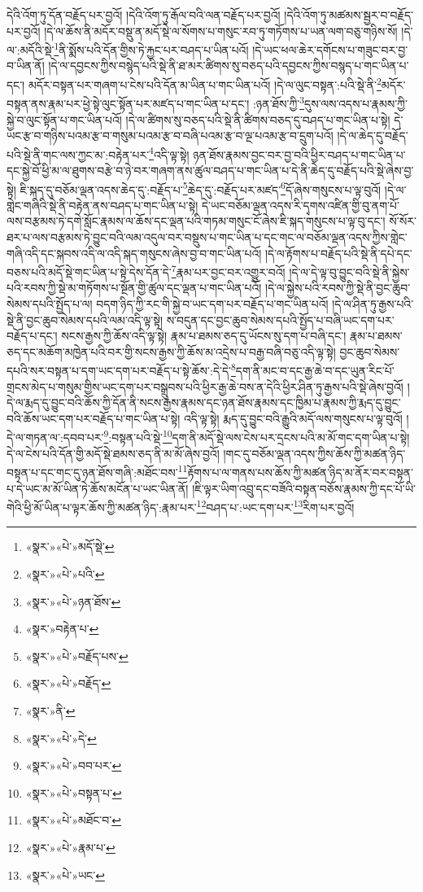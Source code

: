 དེའི་འོག་ཏུ་དོན་བརྗོད་པར་བྱའོ། །དེའི་འོག་ཏུ་རྒོལ་བའི་ལན་བརྗོད་པར་བྱའོ། །དེའི་འོག་ཏུ་མཚམས་སྦྱར་བ་བརྗོད་པར་བྱའོ། །དེ་ལ་ཆོས་ནི་མདོར་བསྡུ་ན་མདོ་སྡེ་ལ་སོགས་པ་གསུང་རབ་ཏུ་གཏོགས་པ་ཡན་ལག་བཅུ་གཉིས་སོ། །དེ་ལ་:མདོའི་སྡེ་\footnote{«སྣར་»«པེ་»མདོ་སྡེ་}ནི་སྨོས་པའི་དོན་གྱིས་ཏེ་རྐྱང་པར་བཤད་པ་ཡིན་པའོ། །དེ་ཡང་ཕལ་ཆེར་དགོངས་པ་གཟུང་བར་བྱ་བ་ཡིན་ནོ། །དེ་ལ་དབྱངས་ཀྱིས་བསྙེད་པའི་སྡེ་ནི་ཐ་མར་ཚིགས་སུ་བཅད་པའི་དབྱངས་ཀྱིས་བསྙད་པ་གང་ཡིན་པ་དང་། མདོར་བསྟན་པར་གཞག་པ་ངེས་པའི་དོན་མ་ཡིན་པ་གང་ཡིན་པའོ། །དེ་ལ་ལུང་བསྟན་:པའི་སྡེ་ནི་\footnote{«སྣར་»«པེ་»པའི་}མདོར་བསྟན་ནས་རྣམ་པར་ཕྱེ་སྟེ་ལུང་སྟོན་པར་མཛད་པ་གང་ཡིན་པ་དང་། :ཉན་ཐོས་ཀྱི་\footnote{«སྣར་»«པེ་»ཉན་ཐོས་}དུས་ལས་འདས་པ་རྣམས་ཀྱི་སྐྱེ་བ་ལུང་སྟོན་པ་གང་ཡིན་པའོ། །དེ་ལ་ཚིགས་སུ་བཅད་པའི་སྡེ་ནི་ཚིགས་བཅད་དུ་བཤད་པ་གང་ཡིན་པ་སྟེ། དེ་ཡང་རྩ་བ་གཉིས་པའམ་རྩ་བ་གསུམ་པའམ་རྩ་བ་བཞི་པའམ་རྩ་བ་ལྔ་པའམ་རྩ་བ་དྲུག་པའོ། །དེ་ལ་ཆེད་དུ་བརྗོད་པའི་སྡེ་ནི་གང་ལས་ཀྱང་མ་:བརྟེན་པར་\footnote{«སྣར་»བརྟེན་པ་}འདི་ལྟ་སྟེ། ཉན་ཐོས་རྣམས་བྱང་བར་བྱ་བའི་ཕྱིར་བཤད་པ་གང་ཡིན་པ་དང་སྐྱེ་བོ་ཕྱི་མ་ལ་ཐུགས་བརྩེ་བ་ཉེ་བར་གཞག་ནས་ཚུལ་བཤད་པ་གང་ཡིན་པ་དེ་ནི་ཆེད་དུ་བརྗོད་པའི་སྡེ་ཞེས་བྱ་སྟེ། ཇི་སྐད་དུ་བཅོམ་ལྡན་འདས་ཆེད་དུ་:བརྗོད་པ་\footnote{«སྣར་»«པེ་»བརྗོད་པས་}ཆེད་དུ་:བརྗོད་པར་མཛད་\footnote{«སྣར་»«པེ་»བརྗོད་}དོ་ཞེས་གསུངས་པ་ལྟ་བུའོ། །དེ་ལ་གླེང་གཞིའི་སྡེ་ནི་བརྟེན་ནས་བཤད་པ་གང་ཡིན་པ་སྟེ། དེ་ཡང་བཅོམ་ལྡན་འདས་རི་དྭགས་འཛིན་གྱི་བུ་ནག་པོ་ལས་བརྩམས་ཏེ་དགེ་སློང་རྣམས་ལ་ཆོས་དང་ལྡན་པའི་གཏམ་གསུང་ངོ་ཞེས་ཇི་སྐད་གསུངས་པ་ལྟ་བུ་དང་། སོ་སོར་ཐར་པ་ལས་བརྩམས་ཏེ་བྱུང་བའི་ལམ་འདུལ་བར་བསྡུས་པ་གང་ཡིན་པ་དང་གང་ལ་བཅོམ་ལྡན་འདས་ཀྱིས་གླེང་གཞི་འདི་དང་སྐབས་འདི་ལ་འདི་སྐད་གསུངས་ཞེས་བྱ་བ་གང་ཡིན་པའོ། །དེ་ལ་རྟོགས་པ་བརྗོད་པའི་སྡེ་ནི་དཔེ་དང་བཅས་པའི་མདོ་སྡེ་གང་ཡིན་པ་སྟེ་དེས་དོན་དེ་\footnote{«སྣར་»ནི་}རྣམ་པར་བྱང་བར་འགྱུར་བའོ། །དེ་ལ་དེ་ལྟ་བུ་བྱུང་བའི་སྡེ་ནི་སྐྱེས་པའི་རབས་ཀྱི་སྡེ་མ་གཏོགས་པ་སྔོན་གྱི་ཚུལ་དང་ལྡན་པ་གང་ཡིན་པའོ། །དེ་ལ་སྐྱེས་པའི་རབས་ཀྱི་སྡེ་ནི་བྱང་ཆུབ་སེམས་དཔའི་སྤྱོད་པ་ལ། བདག་ཉིད་ཀྱི་རང་གི་སྐྱེ་བ་ཡང་དག་པར་བརྗོད་པ་གང་ཡིན་པའོ། །དེ་ལ་ཤིན་ཏུ་རྒྱས་པའི་སྡེ་ནི་བྱང་ཆུབ་སེམས་དཔའི་ལམ་འདི་ལྟ་སྟེ། ས་བདུན་དང་བྱང་ཆུབ་སེམས་དཔའི་སྤྱོད་པ་བཞི་ཡང་དག་པར་བརྗོད་པ་དང་། སངས་རྒྱས་ཀྱི་ཆོས་འདི་ལྟ་སྟེ། རྣམ་པ་ཐམས་ཅད་དུ་ཡོངས་སུ་དག་པ་བཞི་དང་། རྣམ་པ་ཐམས་ཅད་དང་མཆོག་མཁྱེན་པའི་བར་གྱི་སངས་རྒྱས་ཀྱི་ཆོས་མ་འདྲེས་པ་བརྒྱ་བཞི་བཅུ་འདི་ལྟ་སྟེ། བྱང་ཆུབ་སེམས་དཔའི་སར་བསྟན་པ་དག་ཡང་དག་པར་བརྗོད་པ་སྟེ་ཆོས་:དེ་དེ་\footnote{«སྣར་»«པེ་»དེ་}དག་ནི་མང་བ་དང་རྒྱ་ཆེ་བ་དང་ཡུན་རིང་པོ་གྲངས་མེད་པ་གསུམ་གྱིས་ཡང་དག་པར་བསྒྲུབས་པའི་ཕྱིར་རྒྱ་ཆེ་བས་ན་དེའི་ཕྱིར་ཤིན་ཏུ་རྒྱས་པའི་སྡེ་ཞེས་བྱའོ། །དེ་ལ་རྨད་དུ་བྱུང་བའི་ཆོས་ཀྱི་དོན་ནི་སངས་རྒྱས་རྣམས་དང་ཉན་ཐོས་རྣམས་དང་ཁྱིམ་པ་རྣམས་ཀྱི་རྨད་དུ་བྱུང་བའི་ཆོས་ཡང་དག་པར་བརྗོད་པ་གང་ཡིན་པ་སྟེ། འདི་ལྟ་སྟེ། རྨད་དུ་བྱུང་བའི་རྒྱུའི་མདོ་ལས་གསུངས་པ་ལྟ་བུའོ། །དེ་ལ་གཏན་ལ་:དབབ་པར་\footnote{«སྣར་»«པེ་»བབ་པར་}:བསྟན་པའི་སྡེ་\footnote{«སྣར་»«པེ་»བསྟན་པ་}དག་ནི་མདོ་སྡེ་ལས་ངེས་པར་དྲངས་པའི་མ་མོ་གང་དག་ཡིན་པ་སྟེ། དེ་ལ་ངེས་པའི་དོན་གྱི་མདོ་སྡེ་ཐམས་ཅད་ནི་མ་མོ་ཞེས་བྱའོ། །གང་དུ་བཅོམ་ལྡན་འདས་ཀྱིས་ཆོས་ཀྱི་མཚན་ཉིད་བསྟན་པ་དང་གང་དུ་ཉན་ཐོས་གཞི་:མཐོང་བས་\footnote{«སྣར་»«པེ་»མཐོང་བ་}རྟོགས་པ་ལ་གནས་པས་ཆོས་ཀྱི་མཚན་ཉིད་མ་ནོར་བར་བསྟན་པ་དེ་ཡང་མ་མོ་ཡིན་ཏེ་ཆོས་མངོན་པ་ཡང་ཡིན་ནོ། །ཇི་ལྟར་ཡིག་འབྲུ་དང་བཟོའི་བསྟན་བཅོས་རྣམས་ཀྱི་དང་པོ་ཡི་གེའི་ཕྱི་མོ་ཡིན་པ་ལྟར་ཆོས་ཀྱི་མཚན་ཉིད་:རྣམ་པར་\footnote{«སྣར་»«པེ་»རྣམ་པ་}བཤད་པ་:ཡང་དག་པར་\footnote{«སྣར་»«པེ་»ཡང་}རིག་པར་བྱའོ། 
